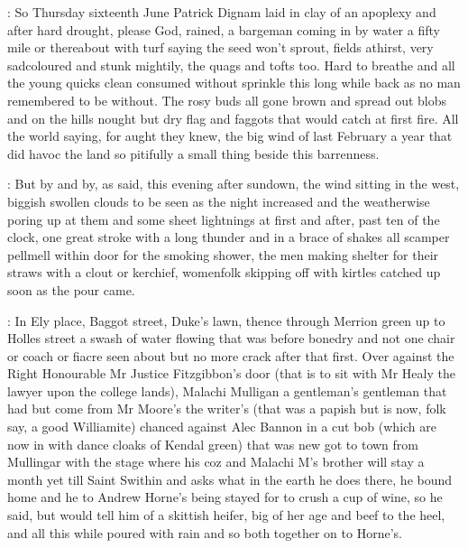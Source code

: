 

:
So Thursday sixteenth June Patrick Dignam laid in clay of an apoplexy
and after hard drought,
please God,
rained,
a bargeman coming in by water
a fifty mile or thereabout with turf saying the seed won't sprout,
fields athirst,
very sadcoloured and stunk mightily,
the quags and tofts too.
Hard to breathe and all the young quicks clean consumed without sprinkle
this long while back as no man remembered to be without.
The rosy buds all gone brown and spread out blobs
and on the hills nought but dry flag
and faggots that would catch at first fire.
All the world saying,
for
aught they knew,
the big wind of last February a year that did havoc the
land so pitifully a small thing beside this barrenness.

:
But by and by,
as said,
this evening after sundown,
the wind sitting
in the west,
biggish swollen clouds to be seen as the night increased and
the weatherwise poring up at them and some sheet lightnings at first and
after,
past ten of the clock,
one great stroke with a long thunder and in
a brace of shakes all scamper pellmell within door for the smoking shower,
the men making shelter for their straws with a clout or kerchief,
womenfolk skipping off with kirtles catched up soon as the pour came.

:
In Ely place,
Baggot street,
Duke's lawn,
thence through Merrion
green up to Holles street a swash of water flowing that was before bonedry
and not one chair or coach or fiacre seen about but no more crack after
that first.
Over against the Right Honourable Mr Justice Fitzgibbon's door
(that is to sit with Mr Healy the lawyer upon the college lands),
Malachi Mulligan a gentleman's gentleman that had but come from Mr Moore's the
writer's
(that was a papish but is now,
folk say,
a good Williamite)
chanced against Alec Bannon in a cut bob
(which are now in with dance
cloaks of Kendal green) that was new got to town from Mullingar with the
stage where his coz and Malachi M's brother will stay a month yet till Saint Swithin
and asks what in the earth he does there,
he bound home and
he to Andrew Horne's being stayed for to crush a cup of wine,
so he said,
but would tell him of a skittish heifer,
big of her age and beef to the
heel,
and all this while poured with rain and so both together on to
Horne's.

